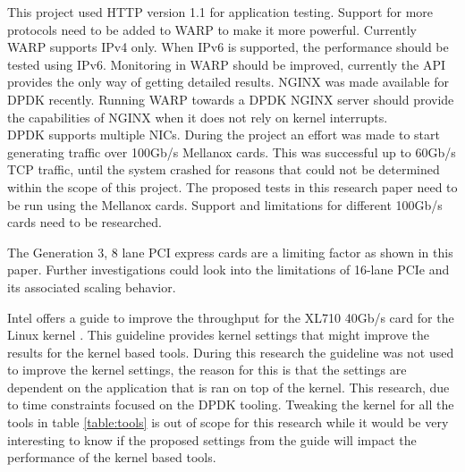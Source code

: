 This project used HTTP version 1.1 for application testing. Support for more protocols need to be added to WARP to make it more powerful. 
Currently WARP supports IPv4 only. When IPv6 is supported, the performance should be tested using IPv6. 
Monitoring in WARP should be improved, currently the API provides the only way of getting detailed results.
NGINX was made available for DPDK recently. Running WARP towards a DPDK NGINX server should provide the capabilities of NGINX when it does not rely on kernel interrupts. \\

DPDK supports multiple NICs. During the project an effort was made to start generating traffic over 100Gb/s Mellanox cards.
This was successful up to 60Gb/s TCP traffic, until the system crashed for reasons that could not be determined within the scope of this project. 
The proposed tests in this research paper need to be run using the Mellanox cards. 
Support and limitations for different 100Gb/s cards need to be researched.

The Generation 3, 8 lane PCI express cards are a limiting factor as shown in this paper. 
Further investigations could look into the limitations of 16-lane PCIe and its associated scaling behavior.

Intel offers a guide to improve the throughput for the XL710 40Gb/s card for the Linux kernel \cite{intellinuxguidxl710}. 
This guideline provides kernel settings that might improve the results for the kernel based tools.
During this research the guideline was not used to improve the kernel settings, the reason for this is that the settings are dependent on the application that is ran on top of the kernel. 
This research, due to time constraints focused on the DPDK tooling. Tweaking the kernel for all the tools in table \ref{table:tools} is out of scope for this research while it would be very interesting to know if the proposed settings from the guide will impact the performance of the kernel based tools. 

